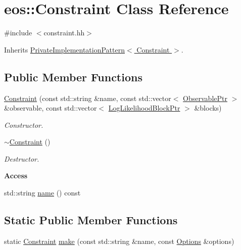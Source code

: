 \hypertarget{classeos_1_1Constraint}{
\section{eos::Constraint Class Reference}
\label{classeos_1_1Constraint}
}


{\ttfamily \#include $<$constraint.hh$>$}

Inherits \hyperlink{classeos_1_1PrivateImplementationPattern}{PrivateImplementationPattern$<$ Constraint $>$}.\subsection*{Public Member Functions}
\begin{DoxyCompactItemize}
\item 
\hyperlink{classeos_1_1Constraint_a2be956c51e9f34e2ed816ed65be76f1e}{Constraint} (const std::string \&name, const std::vector$<$ \hyperlink{namespaceeos_a470e5dd806bd129080f1aa0c2954646f}{ObservablePtr} $>$ \&observable, const std::vector$<$ \hyperlink{namespaceeos_ab823a6782e060c440e05a614158ad1bf}{LogLikelihoodBlockPtr} $>$ \&blocks)
\begin{DoxyCompactList}\small\item\em Constructor. \item\end{DoxyCompactList}\item 
\hyperlink{classeos_1_1Constraint_a9ec79cb58f7a54c65681cd0f05dcb672}{$\sim$Constraint} ()
\begin{DoxyCompactList}\small\item\em Destructor. \item\end{DoxyCompactList}\end{DoxyCompactItemize}
\begin{Indent}{\bf Access}\par
{\em \label{_amgrpbf733d8a933c1601697f364223fc7ecb}
 }\begin{DoxyCompactItemize}
\item 
std::string \hyperlink{classeos_1_1Constraint_a11a3e698b0a00527a6304c6b2ec70a1d}{name} () const 
\end{DoxyCompactItemize}
\end{Indent}
\subsection*{Static Public Member Functions}
\begin{DoxyCompactItemize}
\item 
static \hyperlink{classeos_1_1Constraint}{Constraint} \hyperlink{classeos_1_1Constraint_a5084265f8e196296a885089cf710c096}{make} (const std::string \&name, const \hyperlink{classeos_1_1Options}{Options} \&options)
\end{DoxyCompactItemize}
